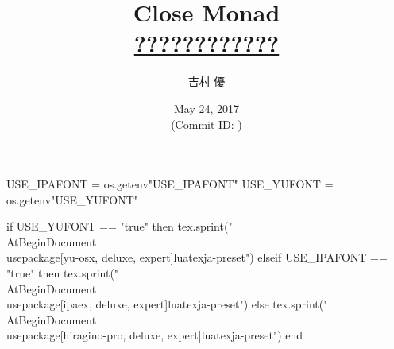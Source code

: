 \hypersetup{colorlinks,linkcolor=,urlcolor=links}

\beamertemplatenavigationsymbolsempty


\usepackage{luacode}
\usepackage{luatexja}
\usepackage{pgfpages}
\usepackage[osf]{mathpazo}

\begin{luacode*}
  USE_IPAFONT = os.getenv"USE_IPAFONT"
  USE_YUFONT = os.getenv"USE_YUFONT"
  
  if USE_YUFONT == "true" then
    tex.sprint("\\AtBeginDocument{\\usepackage[yu-osx, deluxe, expert]{luatexja-preset}}")
  elseif USE_IPAFONT == "true" then
    tex.sprint("\\AtBeginDocument{\\usepackage[ipaex, deluxe, expert]{luatexja-preset}}")
  else
    tex.sprint("\\AtBeginDocument{\\usepackage[hiragino-pro, deluxe, expert]{luatexja-preset}}")
  end
\end{luacode*}

\usepackage{epigraph}
\usepackage{etoolbox}
\usepackage{tikz}
\usepackage{framed}
\usepackage{libertine}
\usepackage{amsmath}
\usepackage{mathtools}
\usepackage{listings}

\renewcommand{\kanjifamilydefault}{\gtdefault}


\setmainfont[Ligatures=TeX]{Linux Libertine O}
\setsansfont[Ligatures=TeX]{CMU Sans Serif}
\setmonofont[Ligatures=TeX]{CMU Typewriter Text}



\title[Close Monad]{%
  Close Monad\\
  {\normalsize \href{}{????????????}}
}
\author{吉村 優}
\date[May 24, 2017]{%
  May 24, 2017 \\%
  {\footnotesize (Commit ID: \GITAbrHash)}
}






